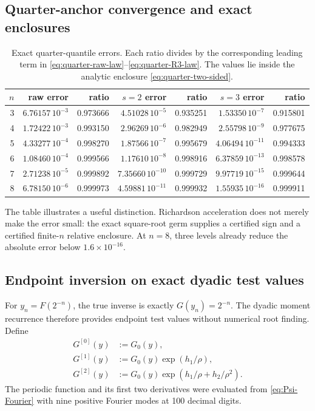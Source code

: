 \documentclass[11pt,oneside]{article}
\numberwithin{equation}{section}
\theoremstyle{definition}
\theoremstyle{remark}
\begin{document}
\subsection{Quarter-anchor convergence and exact enclosures}

\begin{table}[ht]
\centering
\small
\begin{tabular}{@{}r rr rr rr@{}}
\toprule
$n$ & raw error & ratio & $s=2$ error & ratio & $s=3$ error & ratio \\
\midrule
3 & $6.76157\,10^{-3}$ & 0.973666 & $4.51028\,10^{-5}$ & 0.935251 & $1.53350\,10^{-7}$ & 0.915801 \\
4 & $1.72422\,10^{-3}$ & 0.993150 & $2.96269\,10^{-6}$ & 0.982949 & $2.55798\,10^{-9}$ & 0.977675 \\
5 & $4.33277\,10^{-4}$ & 0.998270 & $1.87566\,10^{-7}$ & 0.995679 & $4.06494\,10^{-11}$ & 0.994333 \\
6 & $1.08460\,10^{-4}$ & 0.999566 & $1.17610\,10^{-8}$ & 0.998916 & $6.37859\,10^{-13}$ & 0.998578 \\
7 & $2.71238\,10^{-5}$ & 0.999892 & $7.35660\,10^{-10}$ & 0.999729 & $9.97719\,10^{-15}$ & 0.999644 \\
8 & $6.78150\,10^{-6}$ & 0.999973 & $4.59881\,10^{-11}$ & 0.999932 & $1.55935\,10^{-16}$ & 0.999911 \\
\bottomrule
\end{tabular}
\caption{Exact quarter-quantile errors.  Each ratio divides by the corresponding
leading term in \eqref{eq:quarter-raw-law}--\eqref{eq:quarter-R3-law}.  The values
lie inside the analytic enclosure \eqref{eq:quarter-two-sided}.}
\label{tab:quarter-errors}
\end{table}

The table illustrates a useful distinction.  Richardson acceleration does not merely make
the error small: the exact square-root germ supplies a certified sign and a certified
finite-$n$ relative enclosure.  At $n=8$, three levels already reduce the absolute error
below $1.6\times10^{-16}$.

\subsection{Endpoint inversion on exact dyadic test values}

For $y_n=F(2^{-n})$, the true inverse is exactly $G(y_n)=2^{-n}$.  The dyadic moment
recurrence therefore provides endpoint test values without numerical root finding.  Define
\begin{align}
 G^{[0]}(y)&:=G_0(y),\label{eq:Gapprox0}\\
 G^{[1]}(y)&:=G_0(y)\exp(h_1/\rho),\label{eq:Gapprox1}\\
 G^{[2]}(y)&:=G_0(y)\exp(h_1/\rho+h_2/\rho^2).
 \label{eq:Gapprox2}
\end{align}
The periodic function and its first two derivatives were evaluated from
\eqref{eq:Psi-Fourier} with nine positive Fourier modes at 100 decimal digits.
\end{document}
